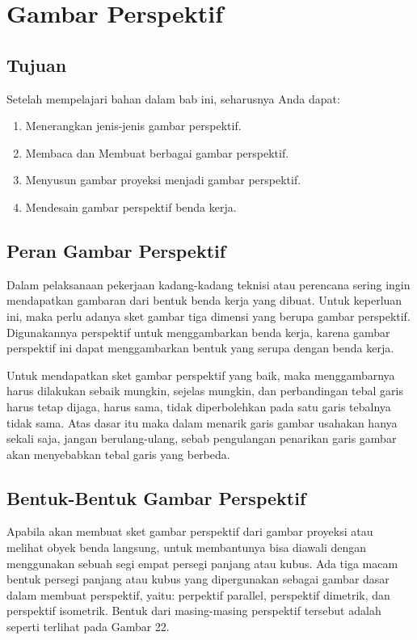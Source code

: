 \documentclass[../menggambarteknik.tex]{subfiles}
\begin{document}
\section{Gambar Perspektif}

\subsection*{Tujuan}
Setelah mempelajari bahan dalam bab ini, seharusnya Anda dapat:
\begin{enumerate}
	\item Menerangkan jenis-jenis gambar perspektif.
	\item Membaca dan Membuat berbagai gambar perspektif.
	\item Menyusun gambar proyeksi menjadi gambar perspektif.
	\item Mendesain gambar perspektif benda kerja.
\end{enumerate}

\subsection{Peran Gambar Perspektif}
Dalam pelaksanaan pekerjaan kadang-kadang teknisi atau perencana sering ingin mendapatkan gambaran dari bentuk benda kerja yang dibuat. Untuk keperluan ini, maka perlu adanya sket gambar tiga dimensi yang berupa gambar perspektif. Digunakannya perspektif untuk menggambarkan benda kerja, karena gambar perspektif ini dapat menggambarkan bentuk yang serupa dengan benda kerja.

Untuk mendapatkan sket gambar perspektif yang baik, maka menggambarnya harus dilakukan sebaik mungkin, sejelas mungkin, dan perbandingan tebal garis harus tetap dijaga, harus sama, tidak diperbolehkan pada satu garis tebalnya tidak sama. Atas dasar itu maka dalam menarik garis gambar usahakan hanya sekali saja, jangan berulang-ulang, sebab pengulangan penarikan garis gambar akan menyebabkan tebal garis yang berbeda.

\subsection{Bentuk-Bentuk Gambar Perspektif}
Apabila akan membuat sket gambar perspektif dari gambar proyeksi atau melihat obyek benda langsung, untuk membantunya bisa diawali dengan menggunakan sebuah segi empat persegi panjang atau kubus. Ada tiga macam bentuk persegi panjang atau kubus yang dipergunakan sebagai gambar dasar dalam membuat perspektif, yaitu: perpektif parallel, perspektif dimetrik, dan perspektif isometrik. Bentuk dari masing-masing perspektif tersebut adalah seperti terlihat pada Gambar 22.
\end{document}
